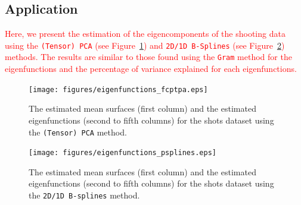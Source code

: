
\subsection{Application} %
\label{sub:application}

\textcolor{red}{Here, we present the estimation of the eigencomponents of the shooting data using the \texttt{(Tensor) PCA} (see Figure~\ref{fig:eigenfunctions_fcptpa}) and \texttt{2D/1D B-Splines} (see Figure~\ref{fig:eigenfunctions_psplines}) methods. The results are similar to those found using the \texttt{Gram} method for the eigenfunctions and the percentage of variance explained for each eigenfunctions.}

\begin{figure}
    \centering
    \texttt{[image: figures/eigenfunctions\_fcptpa.eps]}
    \caption{The estimated mean surfaces (first column) and the estimated eigenfunctions (second to fifth columns) for the shots dataset using the \texttt{(Tensor) PCA} method.}
    \label{fig:eigenfunctions_fcptpa}
\end{figure}

\begin{figure}
    \centering
    \texttt{[image: figures/eigenfunctions\_psplines.eps]}
    \caption{The estimated mean surfaces (first column) and the estimated eigenfunctions (second to fifth columns) for the shots dataset using the \texttt{2D/1D B-splines} method.}
    \label{fig:eigenfunctions_psplines}
\end{figure}


